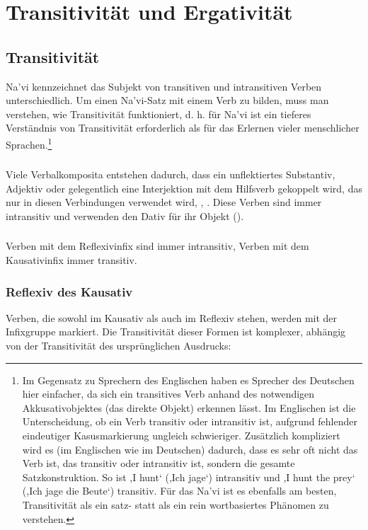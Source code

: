 
\section{Transitivität und Ergativität}

\subsection{Transitivität} Na'vi kennzeichnet das Subjekt von transitiven und intransitiven Verben unterschiedlich. Um einen Na'vi-Satz mit einem Verb zu bilden, muss man verstehen, wie Transitivität funktioniert, d. h. für Na'vi ist ein tieferes Verständnis von Transitivität erforderlich als für das Erlernen vieler menschlicher Sprachen.\footnote{Im Gegensatz zu Sprechern des Englischen haben es Sprecher des Deutschen hier einfacher, da sich ein transitives Verb anhand des notwendigen Akkusativobjektes (das direkte Objekt) erkennen lässt. Im Englischen ist die Unterscheidung, ob ein Verb transitiv oder intransitiv ist, aufgrund fehlender eindeutiger Kasusmarkierung ungleich schwieriger. Zusätzlich kompliziert wird es (im Englischen wie im Deutschen) dadurch, dass es sehr oft nicht das Verb ist, das transitiv oder intransitiv ist, sondern die gesamte Satzkonstruktion. So ist ,I hunt‘ (,Ich jage‘) intransitiv und ,I hunt the prey‘ (,Ich jage die Beute‘) transitiv. Für das Na'vi ist es ebenfalls am besten, Transitivität als ein satz- statt als ein rein wortbasiertes Phänomen zu verstehen.}

\subsubsection{} Viele Verbalkomposita entstehen dadurch, dass ein unflektiertes Substantiv, Adjektiv oder gelegentlich eine Interjektion mit dem Hilfsverb   gekoppelt wird, das nur in diesen Verbindungen verwendet wird,  ,  . Diese Verben sind immer intransitiv und verwenden den Dativ für ihr Objekt
().

\subsubsection{} Verben mit dem Reflexivinfix  sind immer intransitiv, Verben mit dem Kausativinfix  immer transitiv.

\subsubsection{Reflexiv des Kausativ}
\label{reflexive-of-causative} 
Verben, die sowohl im Kausativ als auch im Reflexiv stehen, werden mit der Infixgruppe  markiert. Die Transitivität dieser Formen ist komplexer, abhängig von der Transitivität des ursprünglichen Ausdrucks:

